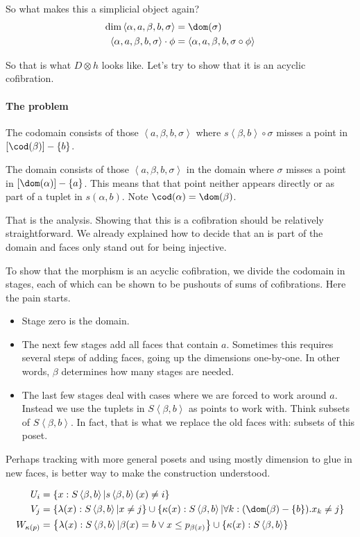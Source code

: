 \documentclass{tac}
\newcommand\set[1]{\left\{#1\right\}}
\newcommand\of{:}
\newcommand\tuplet[1]{\left\langle #1 \right\rangle}
\begin{document}
So what makes this a simplicial object again? 
\begin{align*}
\dim\tuplet{\alpha,a,\beta,b,\sigma} &= \dom(\sigma)\\
\tuplet{\alpha,a,\beta,b,\sigma}\cdot\phi &= \tuplet{\alpha,a,\beta,b,\sigma\circ \phi}
\end{align*}

So that is what $D\otimes h$ looks like. Let's try to show that it is an acyclic cofibration.

\paragraph{The problem}
The codomain consists of those $\tuplet{a,\beta,b,\sigma}$ where $s\tuplet{\beta,b}\circ\sigma$ misses a point in $[\cod(\beta)]-\set b$.

The domain consists of those $\tuplet{a,\beta,b,\sigma}$ in the domain where $\sigma$ misses a point in $[\dom(\alpha)] -\set a$. This means that that point neither appears directly or as part of a tuplet in $s(\alpha,b)$. Note $\cod(\alpha) = \dom(\beta)$.

That is the analysis. Showing that this is a cofibration should be relatively straightforward. We already explained how to decide that an
is part of the domain and faces only stand out for being injective.

To show that the morphism is an acyclic cofibration, we divide the
codomain in stages, each of which can be shown to be pushouts of sums
of cofibrations. Here the pain starts.
\begin{itemize}
\item Stage zero is the domain. 
\item The next few stages add all faces that contain $a$. Sometimes this requires several steps of adding faces, going up the dimensions one-by-one. In other words, $\beta$ determines how many stages are needed.
\item The last few stages deal with cases where we are forced to work around $a$. Instead we use the tuplets in $S\tuplet{\beta,b}$ as points to work with.
Think subsets of $S\tuplet{\beta,b}$. In fact, that is what we replace the old faces with: subsets of this poset.
\end{itemize}

Perhaps tracking with more general posets and using mostly dimension to glue in new faces, is better way to make the construction understood.

\begin{align*}
U_i &= \set{x\of S\tuplet{\beta,b} | s\tuplet{\beta,b}(x) \neq i } \\
V_j &= \set{\lambda(x)\of S\tuplet{\beta,b} | x \neq j }\cup\set{\kappa(x)\of S\tuplet{\beta,b}| \forall k\of(\dom(\beta)-\set b). x_k\neq j } \\
W_{\kappa(p)} &= \set{\lambda(x)\of S\tuplet{\beta,b} | \beta(x) = b \vee x \leq p_{\beta(x)} }\cup\set{\kappa(x)\of S\tuplet{\beta,b}} \\
\end{align*}
\end{document}
